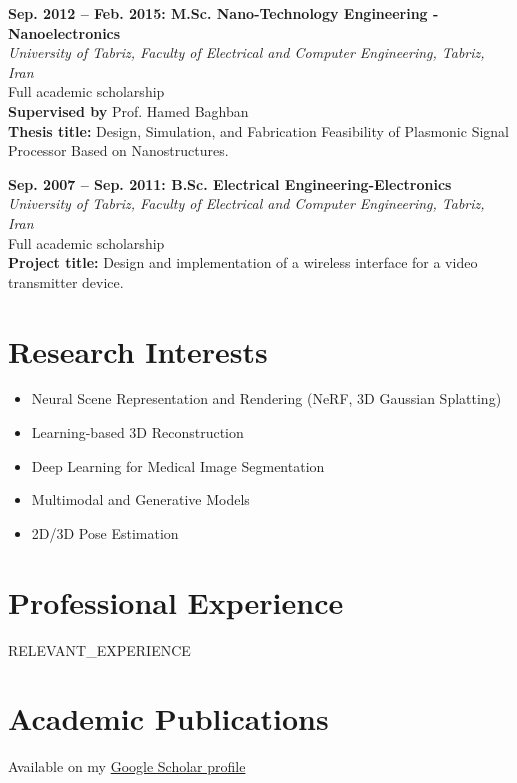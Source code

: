 \documentclass[11pt,a4paper]{article}
\newcommand{\blueitem}[1]{\textcolor{subtitleblue}{\textbf{#1}}}
\begin{document}
\blueitem{Sep. 2012 -- Feb. 2015: M.Sc. Nano-Technology Engineering - Nanoelectronics}\\
\textit{University of Tabriz, Faculty of Electrical and Computer Engineering, Tabriz, Iran} \\
Full academic scholarship\\
\textbf{Supervised by} Prof. Hamed Baghban \\
\textbf{Thesis title:} Design, Simulation, and Fabrication Feasibility of Plasmonic Signal Processor Based on Nanostructures.

\vspace{0.3em}
\blueitem{Sep. 2007 -- Sep. 2011: B.Sc. Electrical Engineering-Electronics} \\
\textit{University of Tabriz, Faculty of Electrical and Computer Engineering, Tabriz, Iran} \\
Full academic scholarship\\
\textbf{Project title:} Design and implementation of a wireless interface for a video transmitter device.

\vspace{1em}

\section*{Research Interests}
\begin{itemize}
    \item Neural Scene Representation and Rendering (NeRF, 3D Gaussian Splatting)
    \item Learning-based 3D Reconstruction
    \item Deep Learning for Medical Image Segmentation
    \item Multimodal and Generative Models
    \item 2D/3D Pose Estimation
\end{itemize}

\section*{Professional Experience}
{{RELEVANT_EXPERIENCE}}


\section*{Academic Publications}

Available on my \href{https://scholar.google.com/citations?user=gzbZN8MAAAAJ&hl=en}{Google Scholar profile}
\end{document}
